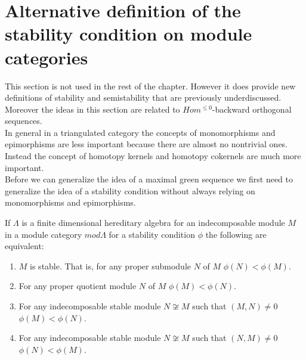 \section{Alternative definition of the stability condition on module categories}
\indent This section is not used in the rest of the chapter. However it does provide new definitions of stability and semistability that are previously underdiscussed. Moreover the ideas in this section are related to $Hom^{\leq 0}$-backward orthogonal sequences.\\
\indent In general in a triangulated category the concepts of monomorphisms and epimorphisms are less important because there are almost no nontrivial ones. Instead the concept of homotopy kernels and homotopy cokernels are much more important.\\
\indent Before we can generalize the idea of a maximal green sequence we first need to generalize the idea of a stability condition without always relying on monomorphisms and epimorphisms.\\
\begin{theorem}
If $\Lambda$ is a finite dimensional hereditary algebra for an indecomposable module $M$ in a module category $mod \Lambda$ for a stability condition $\phi$ the following are equivalent:
\begin{enumerate}
\item $M$ is stable. That is, for any proper submodule $N$ of $M$ $\phi(N)<\phi(M)$.
\item For any proper quotient module $N$ of $M$ $\phi(M)<\phi(N)$.
\item For any indecomposable stable module $N\not\cong M$ such that $(M,N)\neq 0$ $\phi(M)<\phi(N)$.
\item For any indecomposable stable module $N\not\cong M$ such that $(N,M)\neq 0$ $\phi(N)<\phi(M)$.
\end{enumerate}
\end{theorem}
